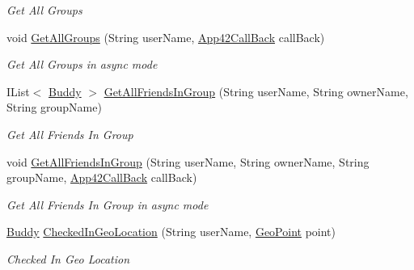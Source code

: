 \begin{DoxyCompactItemize}
\begin{DoxyCompactList}\small\item\em Get All Groups \end{DoxyCompactList}\item 
void \hyperlink{classcom_1_1shephertz_1_1app42_1_1paas_1_1sdk_1_1csharp_1_1buddy_1_1_buddy_service_af4660d5c1554d866714094ab32560c5a}{Get\+All\+Groups} (String user\+Name, \hyperlink{interfacecom_1_1shephertz_1_1app42_1_1paas_1_1sdk_1_1csharp_1_1_app42_call_back}{App42\+Call\+Back} call\+Back)
\begin{DoxyCompactList}\small\item\em Get All Groups in async mode \end{DoxyCompactList}\item 
I\+List$<$ \hyperlink{classcom_1_1shephertz_1_1app42_1_1paas_1_1sdk_1_1csharp_1_1buddy_1_1_buddy}{Buddy} $>$ \hyperlink{classcom_1_1shephertz_1_1app42_1_1paas_1_1sdk_1_1csharp_1_1buddy_1_1_buddy_service_a508cc16b9e40e80b9b74a93e68110494}{Get\+All\+Friends\+In\+Group} (String user\+Name, String owner\+Name, String group\+Name)
\begin{DoxyCompactList}\small\item\em Get All Friends In Group \end{DoxyCompactList}\item 
void \hyperlink{classcom_1_1shephertz_1_1app42_1_1paas_1_1sdk_1_1csharp_1_1buddy_1_1_buddy_service_ad39f3803aa7ffeb3a2885201822e13a8}{Get\+All\+Friends\+In\+Group} (String user\+Name, String owner\+Name, String group\+Name, \hyperlink{interfacecom_1_1shephertz_1_1app42_1_1paas_1_1sdk_1_1csharp_1_1_app42_call_back}{App42\+Call\+Back} call\+Back)
\begin{DoxyCompactList}\small\item\em Get All Friends In Group in async mode \end{DoxyCompactList}\item 
\hyperlink{classcom_1_1shephertz_1_1app42_1_1paas_1_1sdk_1_1csharp_1_1buddy_1_1_buddy}{Buddy} \hyperlink{classcom_1_1shephertz_1_1app42_1_1paas_1_1sdk_1_1csharp_1_1buddy_1_1_buddy_service_a1c8a141acfaf3c333a23f22858c062e5}{Checked\+In\+Geo\+Location} (String user\+Name, \hyperlink{classcom_1_1shephertz_1_1app42_1_1paas_1_1sdk_1_1csharp_1_1geo_1_1_geo_point}{Geo\+Point} point)
\begin{DoxyCompactList}\small\item\em Checked In Geo Location \end{DoxyCompactList}\item 

\end{DoxyCompactItemize}
